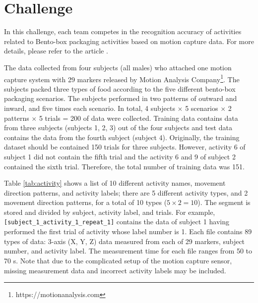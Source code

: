 \documentclass[graybox]{svmult}
\begin{document}
\section{Challenge}
\label{sec:challenge}
In this challenge, each team competes in the recognition accuracy of activities related to Bento-box packaging activities based on motion capture data. For more details, please refer to the article \cite{ex2}.\par

The data collected from four subjects (all males) who attached one motion capture system with 29 markers released by Motion Analysis Company\footnote{https://motionanalysis.com}. The subjects packed three types of food according to the five different bento-box packaging scenarios. The subjects performed in two patterns of outward and inward, and five times each scenario. In total, 4 subjects $\times$ 5 scenarios $\times$ 2 patterns $\times$ 5 trials = 200 of data were collected. Training data contains data from three subjects (subjects 1, 2, 3) out of the four subjects and test data contains the data from the fourth subject (subject 4). Originally, the training dataset should be contained 150 trials for three subjects. However, activity 6 of subject 1 did not contain the fifth trial and the activity 6 and 9 of subject 2 contained the sixth trial. Therefore, the total number of training data was 151.\par

Table \ref{tab:activity} shows a list of 10 different activity names, movement direction patterns, and activity labels; there are 5 different activity types, and 2 movement direction patterns, for a total of 10 types ($5 \times 2 = 10$). The segment is stored and divided by subject, activity label, and trials. For example, {\tt [subject\verb|_|1\verb|_|activity\verb|_|1\verb|_|repeat\verb|_|1]} contains the data of subject 1 having performed the first trial of activity whose label number is 1. Each file contains 89 types of data: 3-axis (X, Y, Z) data measured from each of 29 markers, subject number, and activity label. The measurement time for each file ranges from 50 to 70 s. Note that due to the complicated setup of the motion capture sensor, missing measurement data and incorrect activity labels may be included.\par
\end{document}

